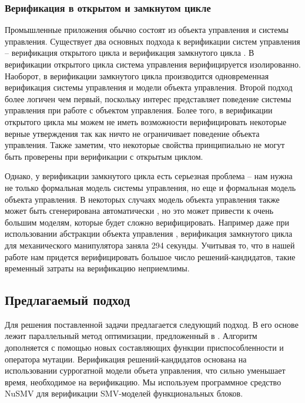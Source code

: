\documentclass[14pt]{article}
\begin{document}
\subsubsection{Верификация в открытом и замкнутом цикле}

Промышленные приложения обычно состоят из объекта управления и системы управления.
Существует два основных подхода к верификации систем управления --
верификация открытого цикла и верификация замкнутого цикла \cite{cl}. В верификации
открытого цикла система управления верифицируется изолированно. Наоборот, в
верификации замкнутого цикла производится одновременная верификация системы управления
и модели объекта управления. Второй подход более логичен чем первый, поскольку
интерес представляет поведение системы управления при работе с объектом управления. Более того, в
верификации открытого цикла мы можем не иметь возможности верифицировать
некоторые верные утверждения так как ничто не ограничивает поведение объекта управления.
Также заметим, что некоторые свойства принципиально не могут быть проверены при
верификации с открытым циклом.

Однако, у верификации замкнутого цикла есть серьезная проблема -- нам нужна не
только формальная модель системы управления, но еще и формальная модель объекта управления.
В некоторых случаях модель объекта управления также может быть сгенерирована
автоматически \cite{dd}, но это может привести к очень большим моделям, которые будет
сложно верифицировать. Например даже при использовании абстракции объекта управления \cite{dd},
верификация замкнутого цикла для механического манипулятора заняла
294 секунды. Учитывая то, что в нашей работе нам придется верифицировать
большое число решений-кандидатов, такие временный затраты на верификацию неприемлимы.

\subsection{Предлагаемый подход}

Для решения поставленной задачи предлагается следующий подход.  В его основе лежит параллельный
метод оптимизации, предложенный в \cite{rec}. Алгоритм дополняется с помощью новых
составляющих функции приспособленности и оператора мутации. Верификация
решений-кандидатов основана на использовании суррогатной модели объета управления, что сильно уменьшает время,
необходимое на верификацию. Мы используем программное средство NuSMV \cite{nusmv} для верификации SMV-моделей
функциональных блоков.
\end{document}
